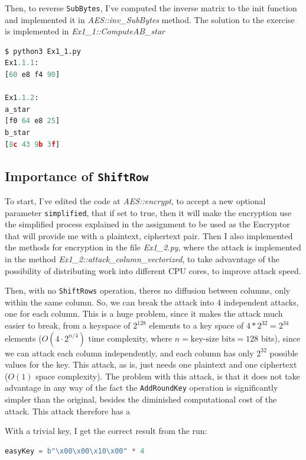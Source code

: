 \documentclass{article}
\begin{document}
Then, to reverse \texttt{SubBytes}, I've computed the inverse matrix to the init function and implemented it in \textit{AES::inv\_SubBytes} method. The solution to the exercise is implemented in \textit{Ex1\_1::ComputeAB\_star}

\begin{lstlisting}[language=python]
$ python3 Ex1_1.py
Ex1.1.1:
[60 e8 f4 90]

Ex1.1.2:
a_star
[f0 64 e8 25]
b_star
[8c 43 9b 3f]
\end{lstlisting}

\subsection{Importance of \texttt{ShiftRow}}
To start, I've edited the code at \textit{AES::encrypt}, to accept a new optional parameter \texttt{simplified}, that if set to true, then it will make the encryption use the simplified process explained in the assignment to be used as the Encryptor that will provide me with a plaintext, ciphertext pair. Then I also implemented the methods for encryption in the file \textit{Ex1\_2.py}, where the attack is implemented in the method \textit{Ex1\_2::attack\_column\_vectorized}, to take advavntage of the possibility of distributing work into different CPU cores, to improve attack speed.

Then, with no \texttt{ShiftRows} operation, theres no diffusion between columns, only within the same column. So, we can break the attack into 4 independent attacks, one for each column. This is a huge problem, since it makes the attack much easier to break, from a keyspace of $2^{128}$ elements to a key space of $4*2^{32} = 2^{34}$ elements ($O(4 \cdot 2^{n/4})$ time complexity, where $n=\text{key-size bits}=128$ bits), since we can attack each column independently, and each column has only $2^{32}$ possible values for the key.
This attack, as is, just needs one plaintext and one ciphertext ($O(1)$ space complexity). The problem with this attack, is that it does not take advantage in any way of the fact the \texttt{AddRoundKey} operation is significantly simpler than the original, besides the diminished computational cost of the attack. This attack therefore has a 

With a trivial key, I get the correct result from the run:
\begin{lstlisting}[language=Python]
easyKey = b"\x00\x00\x10\x00" * 4
\end{lstlisting}
\end{document}

